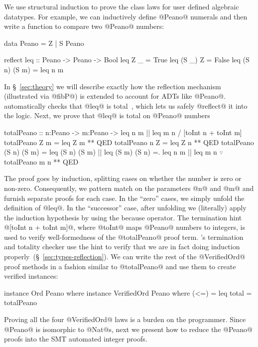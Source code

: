 %
We use structural induction to prove the class laws
for user defined algebraic datatypes. For example,
we can inductively define @Peano@ numerals
and then write a function to compare two @Peano@
numbers:
%
\begin{mcode}
    data Peano = Z | S Peano

    reflect leq :: Peano -> Peano -> Bool
    leq Z _         = True
    leq (S _) Z     = False
    leq (S n) (S m) = leq n m
\end{mcode}
%
In \S~\ref{sec:theory} we will describe
exactly how the reflection mechanism (illustrated
via @fibP@) is extended to account for ADTs like @Peano@.
%
\toolname automatically checks
that @leq@ is total~\citep{Vazou14}, which
lets us safely @reflect@ it into the logic.
%
Next, we prove that @leq@ is total on @Peano@ numbers
%
\begin{mcode}
    totalPeano :: n:Peano -> m:Peano -> {leq n m || leq m n} / [toInt n + toInt m]
    totalPeano Z     m     = leq Z m ** QED
    totalPeano n     Z     = leq Z n ** QED
    totalPeano (S n) (S m) =  leq (S n) (S m) || leq (S m) (S n)
                           =. leq n m || leq m n
                           $\because$ totalPeano m n ** QED
\end{mcode}
%
The proof goes by induction, splitting cases on
whether the number is zero or non-zero. Consequently,
we pattern match on the parameters @n@ and @m@ and furnish
separate proofs for each case.
%
In the ``zero'' cases, we simply unfold the definition
of @leq@.
%
In the ``successor'' case, after unfolding we (literally)
apply the induction hypothesis by using the because operator.
%
The termination hint @[toInt n + toInt m]@,
where @toInt@ maps @Peano@ numbers to integers,
is used to verify well-formedness of the @totalPeano@
proof term.
%
\toolname's termination and totality checker
use the hint to
verify that we are in fact doing induction
properly~(\S~\ref{sec:types-reflection}).
%
We can write the rest of the @VerifiedOrd@ proof methods
in a fashion similar to @totalPeano@ and use them to
create verified instances:
%
\begin{code}
    instance Ord Peano where          instance VerifiedOrd Peano where
      (<=) = leq                        total = totalPeano
\end{code}
%
Proving all the four @VerifiedOrd@ laws is a burden on the programmer.
%
Since @Peano@ is isomorphic to @Nat@s, next we present how
to reduce the @Peano@ proofs into the SMT automated integer proofs.

